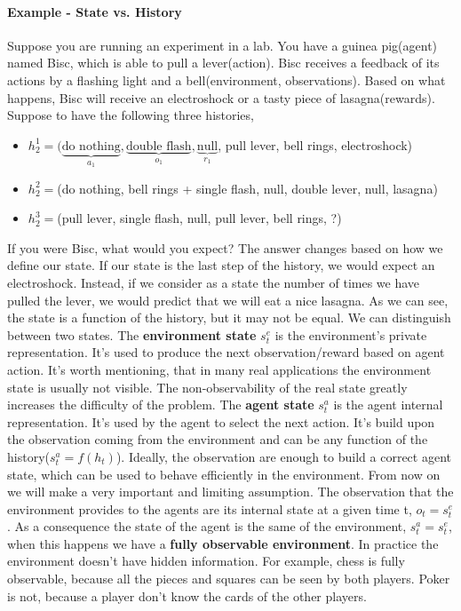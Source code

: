 \documentclass[main.tex]{subfiles}
\begin{document}
\paragraph{Example - State vs. History} Suppose you are running an experiment in a lab. You have a guinea pig(agent) named Bisc, which is able to pull a lever(action). Bisc receives a feedback of its actions by a flashing light and a bell(environment, observations). Based on what happens, Bisc will receive an electroshock or a tasty piece of lasagna(rewards). Suppose to have the following three histories,
\begin{itemize}
    \item $h_2^1 = (\underbrace{\text{do nothing}}_{a_1}, \underbrace{\text{double flash}}_{o_1}, \underbrace{\text{null}}_{r_1}$, pull lever, bell rings, electroshock)
    \item $h_2^2 = $(do nothing, bell rings + single flash, null, double lever, null, lasagna)
    \item $h_2^3 = $(pull lever, single flash, null, pull lever, bell rings, ?)
\end{itemize}
If you were Bisc, what would you expect? The answer changes based on how we define our state. If our state is the last step of the history, we would expect an electroshock. Instead, if we consider as a state the number of times we have pulled the lever, we would predict that we will eat a nice lasagna.
As we can see, the state is a function of the history, but it may not be equal.
\newline
\newline
We can distinguish between two states. The \textbf{environment state} $s_t^e$ is the environment's private representation. It's used to produce the next observation/reward based on agent action. It's worth mentioning, that in many real applications the environment state is usually not visible. The non-observability of the real state greatly increases the difficulty of the problem.
The \textbf{agent state} $s_t^a$ is the agent internal representation. It's used by the agent to select the next action. It's build upon the observation coming from the environment and can be any function of the history($s_t^a = f(h_t)$). Ideally, the observation are enough to build a correct agent state, which can be used to behave efficiently in the environment. From now on we will make a very important and limiting assumption. The observation that the environment provides to the agents are its internal state at a given time t, $o_t = s_t^e$. As a consequence the state of the agent is the same of the environment, $s_t^a = s_t^e$, when this happens we have a \textbf{fully observable environment}. In practice the environment doesn't have hidden information. For example, chess is fully observable, because all the pieces and squares can be seen by both players. Poker is not, because a player don't know the cards of the other players.
\end{document}
